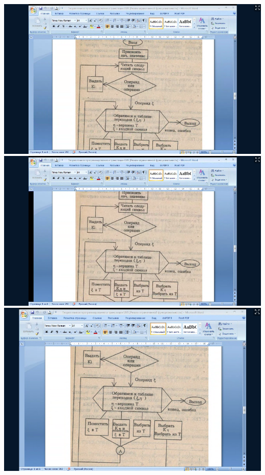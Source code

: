 \documentclass{article}
\begin{document}
    \begin{table}
        
    \end{table}
    \includegraphics[scale=0.5]{pictures/2.png}
    \includegraphics[scale=0.5]{pictures/3.png}
    \includegraphics[scale=0.5]{pictures/4.png}
\end{document}
